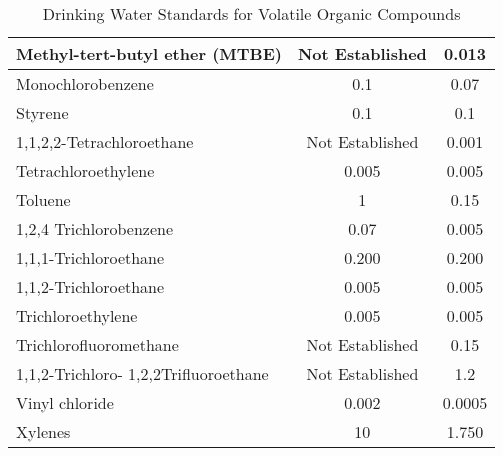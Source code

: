 \begin{table}[ht]
\begin{center}
\begin{tabular}{|l|c|c|}
Methyl-tert-butyl   ether   (MTBE)                                         & Not   Established & 0.013 \\ \hline
Monochlorobenzene                                                          & 0.1 & 0.07\\ \hline
Styrene                                                                    & 0.1  & 0.1  \\ \hline
1,1,2,2-Tetrachloroethane & Not   Established & 0.001\\ \hline
Tetrachloroethylene                                                        & 0.005   & 0.005  \\ \hline
Toluene                                                                    & 1 & 0.15 \\ \hline
1,2,4   Trichlorobenzene                                                   & 0.07   & 0.005  \\ \hline
1,1,1-Trichloroethane                                                      & 0.200 & 0.200\\ \hline
1,1,2-Trichloroethane                                                      & 0.005  & 0.005 \\ \hline
Trichloroethylene                                                          & 0.005 & 0.005\\ \hline
Trichlorofluoromethane                                                     & Not   Established & 0.15 \\ \hline
1,1,2-Trichloro-   1,2,2Trifluoroethane                                    & Not   Established & 1.2   \\ \hline
Vinyl   chloride                                                           & 0.002              & 0.0005 \\ \hline
Xylenes                                                                    & 10                & 1.750 \\ \hline
\end{tabular}
\caption{Drinking Water Standards for Volatile Organic Compounds}
\end{center}
\end{table}


